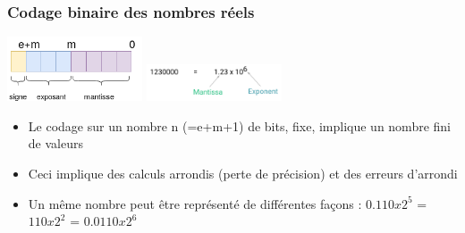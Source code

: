 \documentclass{beamer}
\begin{document}
\begin{frame}
  \frametitle{Codage binaire des nombres réels}
  \begin{center}
    \includegraphics[width=4cm]{img/ieee754.png}
    \hspace{5mm}
    \includegraphics[width=4cm]{figs/minetosa.png}
  \end{center}
  \begin{itemize}
  \item Le codage sur un nombre n (=e+m+1) de bits, fixe, implique un
    nombre fini de valeurs
  \item \textcolor{Mycolor1}{Ceci implique des calculs arrondis (perte de précision) et des erreurs} d'arrondi
  \item Un même nombre peut être représenté de différentes façons :
  $0.110x2^5$ = $110x2^2$ = $0.0110x2^6$
  \end{itemize}  
\end{frame}
\end{document}
